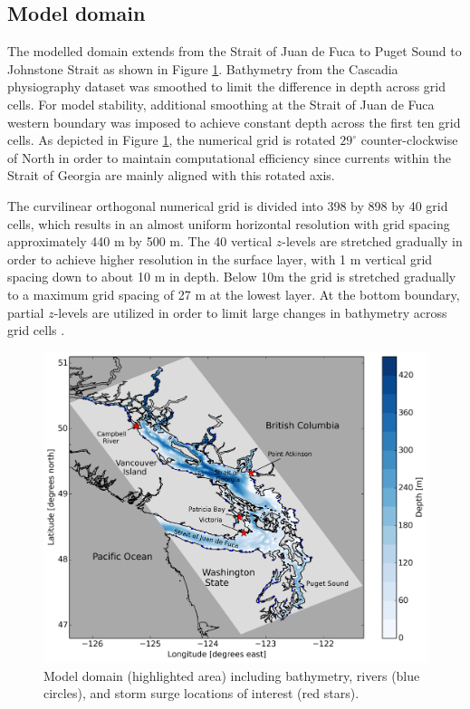\documentclass[pdftex,10pt]{article}
\begin{document}
\subsection{Model domain}
The modelled domain extends from the Strait of Juan de Fuca to Puget Sound to Johnstone Strait as shown in Figure \ref{fig:domain}. Bathymetry from the Cascadia physiography dataset \citep{haugerud1999digital} was smoothed to limit the difference in depth across grid cells. For model stability, additional smoothing at the Strait of Juan de Fuca western boundary was imposed to achieve constant depth across the first ten grid cells. As depicted in Figure \ref{fig:domain}, the numerical grid is rotated $29^{\circ}$ counter-clockwise of North in order to maintain computational efficiency since currents within the Strait of Georgia are mainly aligned with this rotated axis. 

The curvilinear orthogonal numerical grid is divided into 398 by 898 by 40 grid cells, which results in an almost uniform horizontal resolution with grid spacing approximately 440 m by 500 m. The 40 vertical $z$-levels are stretched gradually in order to achieve higher resolution in the surface layer, with 1 m vertical grid spacing down to about 10 m in depth. Below 10m the grid is stretched gradually to a maximum grid spacing of 27 m at the lowest layer. At the bottom boundary, partial $z$-levels are utilized in order to limit large changes in bathymetry across grid cells \citep{madec2008nemo}. 


\begin{figure}[h]
\centering
\includegraphics[scale=0.5]{Figures/bathy.pdf}
\caption{Model domain (highlighted area) including bathymetry, rivers (blue circles), and storm surge locations of interest  (red stars).}\label{fig:domain}
\end{figure}
\end{document}
